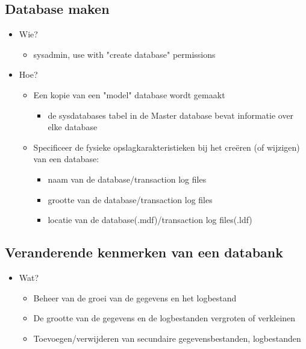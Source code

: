\documentclass{report}
\begin{document}
    \subsection{Database maken}
    
   	\begin{itemize}
        \item Wie?
        \begin{itemize}
            \item sysadmin, use with "create database" permissions
        \end{itemize}
        \item Hoe?
        \begin{itemize}
            \item Een kopie van een "model" database wordt gemaakt
            \begin{itemize}
                \item de sysdatabases tabel in de Master database bevat informatie over elke database
            \end{itemize}
            \item Specificeer de fysieke opslagkarakteristieken bij het creëren (of wijzigen) van een database:
            \begin{itemize}
                \item naam van de database/transaction log files
                \item grootte van de database/transaction log files
                \item locatie van de database(.mdf)/transaction log files(.ldf)
            \end{itemize}
        \end{itemize}
    \end{itemize}

    \subsection{Veranderende kenmerken van een databank}
   	\begin{itemize}  
        \item Wat?
        \begin{itemize}
            \item Beheer van de groei van de gegevens en het logbestand
            \item De grootte van de gegevens en de logbestanden vergroten of verkleinen
            \item Toevoegen/verwijderen van secundaire gegevensbestanden, logbestanden
        \end{itemize}
    \end{itemize}
\end{document}
